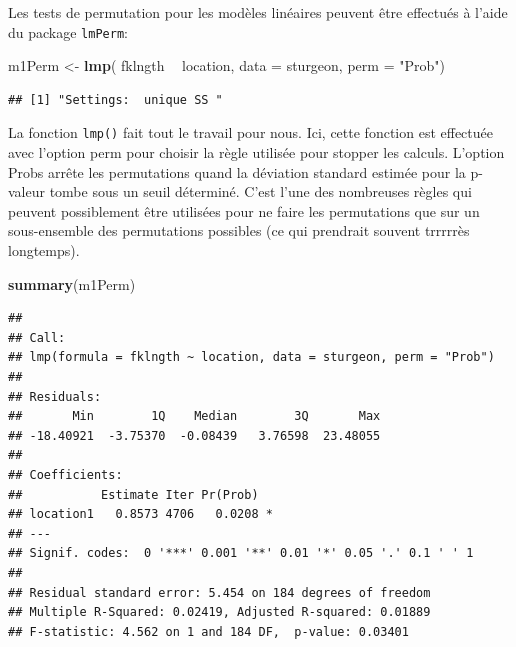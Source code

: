 \documentclass[12pt,]{book}
\newenvironment{Shaded}{\begin{snugshade}}{\end{snugshade}}
\newcommand{\DataTypeTok}[1]{\textcolor[rgb]{0.27,0.27,0.27}{#1}}
\newcommand{\KeywordTok}[1]{\textcolor[rgb]{0.27,0.27,0.27}{\textbf{#1}}}
\newcommand{\NormalTok}[1]{#1}
\newcommand{\OperatorTok}[1]{\textcolor[rgb]{0.43,0.43,0.43}{\textbf{#1}}}
\newcommand{\StringTok}[1]{\textcolor[rgb]{0.5,0.5,0.5}{#1}}
\begin{document}
Les tests de permutation pour les modèles linéaires peuvent être effectués à l'aide du package \texttt{lmPerm}:

\begin{Shaded}
\begin{Highlighting}[]
\NormalTok{m1Perm <-}\StringTok{ }\KeywordTok{lmp}\NormalTok{(}
\NormalTok{  fklngth }\OperatorTok{~}\StringTok{ }\NormalTok{location, }\DataTypeTok{data =}\NormalTok{ sturgeon,}
  \DataTypeTok{perm =} \StringTok{"Prob"}\NormalTok{)}
\end{Highlighting}
\end{Shaded}

\begin{verbatim}
## [1] "Settings:  unique SS "
\end{verbatim}

La fonction \texttt{lmp()} fait tout le travail pour nous. Ici, cette fonction est effectuée avec l'option perm pour choisir la règle utilisée pour stopper les calculs. L'option Probs arrête les permutations quand la déviation standard estimée pour la p-valeur tombe sous un seuil déterminé. C'est l'une des nombreuses règles qui peuvent possiblement être utilisées pour ne faire les permutations que sur un sous-ensemble des permutations possibles (ce qui prendrait souvent trrrrrès longtemps).

\begin{Shaded}
\begin{Highlighting}[]
\KeywordTok{summary}\NormalTok{(m1Perm)}
\end{Highlighting}
\end{Shaded}

\begin{verbatim}
## 
## Call:
## lmp(formula = fklngth ~ location, data = sturgeon, perm = "Prob")
## 
## Residuals:
##       Min        1Q    Median        3Q       Max 
## -18.40921  -3.75370  -0.08439   3.76598  23.48055 
## 
## Coefficients:
##           Estimate Iter Pr(Prob)  
## location1   0.8573 4706   0.0208 *
## ---
## Signif. codes:  0 '***' 0.001 '**' 0.01 '*' 0.05 '.' 0.1 ' ' 1
## 
## Residual standard error: 5.454 on 184 degrees of freedom
## Multiple R-Squared: 0.02419,	Adjusted R-squared: 0.01889 
## F-statistic: 4.562 on 1 and 184 DF,  p-value: 0.03401
\end{verbatim}
\end{document}
